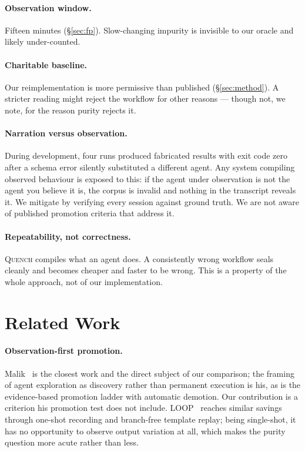 \documentclass[10pt,conference]{article}
\newcommand{\quench}{\textsc{Quench}}
\begin{document}
\paragraph{Observation window.} Fifteen minutes (\S\ref{sec:fp}). Slow-changing
impurity is invisible to our oracle and likely under-counted.

\paragraph{Charitable baseline.} Our reimplementation is more permissive than
published (\S\ref{sec:method}). A stricter reading might reject the workflow for
other reasons --- though not, we note, for the reason purity rejects it.

\paragraph{Narration versus observation.} During development, four runs produced
fabricated results with exit code zero after a schema error silently substituted
a different agent. Any system compiling observed behaviour is exposed to this:
if the agent under observation is not the agent you believe it is, the corpus is
invalid and nothing in the transcript reveals it. We mitigate by verifying every
session against ground truth. We are not aware of published promotion criteria
that address it.

\paragraph{Repeatability, not correctness.} \quench{} compiles what an agent
does. A consistently wrong workflow seals cleanly and becomes cheaper and faster
to be wrong. This is a property of the whole approach, not of our implementation.

\section{Related Work}
\label{sec:related}

\paragraph{Observation-first promotion.} Malik~\cite{malik2026} is the closest
work and the direct subject of our comparison; the framing of agent exploration
as discovery rather than permanent execution is his, as is the evidence-based
promotion ladder with automatic demotion. Our contribution is a criterion his
promotion test does not include. LOOP~\cite{loop2026} reaches similar savings
through one-shot recording and branch-free template replay; being single-shot,
it has no opportunity to observe output variation at all, which makes the purity
question more acute rather than less.
\end{document}
